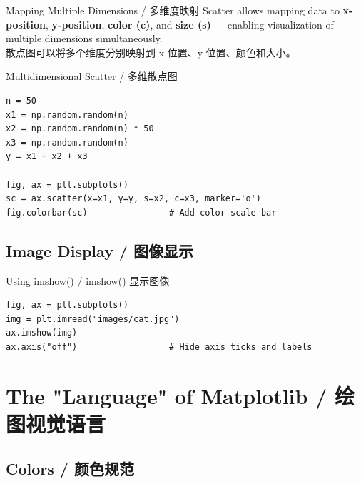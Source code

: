 \documentclass[11pt,a4paper]{report}
\begin{document}
\begin{concept}{Mapping Multiple Dimensions / 多维度映射}
    Scatter allows mapping data to \textbf{x-position}, \textbf{y-position}, \textbf{color (c)}, and \textbf{size (s)} — enabling visualization of multiple dimensions simultaneously. \\
    散点图可以将多个维度分别映射到 x 位置、y 位置、颜色和大小。
\end{concept}

\begin{examplebox}{Multidimensional Scatter / 多维散点图}
\begin{lstlisting}
n = 50
x1 = np.random.random(n)
x2 = np.random.random(n) * 50
x3 = np.random.random(n)
y = x1 + x2 + x3

fig, ax = plt.subplots()
sc = ax.scatter(x=x1, y=y, s=x2, c=x3, marker='o')
fig.colorbar(sc)                # Add color scale bar
\end{lstlisting}
\end{examplebox}

\subsection{Image Display / 图像显示}

\begin{examplebox}{Using imshow() / imshow() 显示图像}
\begin{lstlisting}
fig, ax = plt.subplots()
img = plt.imread("images/cat.jpg")
ax.imshow(img)
ax.axis("off")                  # Hide axis ticks and labels
\end{lstlisting}
\end{examplebox}

\section{The "Language" of Matplotlib / 绘图视觉语言}

\subsection{Colors / 颜色规范}
\end{document}
